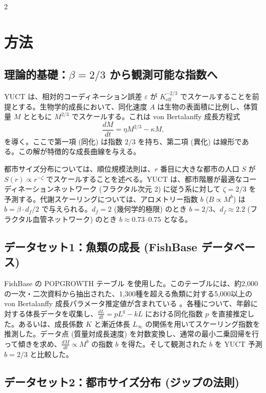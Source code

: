 \documentclass[11pt,a4paper]{article}
\newcommand{\eps}{\varepsilon}
\newcommand{\Keff}{K_{\mathrm{eff}}}
\newcommand{\betaf}{\beta}
\newcommand{\df}{d_f}
\begin{document}
\begin{multicols}{2}
		\section{方法}
		
		\subsection{理論的基礎：\(\beta = 2/3\) から観測可能な指数へ}
		
		YUCT は、相対的コーディネーション誤差 \(\eps\) が \(\Keff^{-2/3}\) でスケールすることを前提とする。生物学的成長において、同化速度 \(A\) は生物の表面積に比例し、体質量 \(M\) とともに \(M^{2/3}\) でスケールする。これは von Bertalanffy 成長方程式
		\[
		\frac{dM}{dt} = \eta M^{2/3} - \kappa M,
		\]
		を導く。ここで第一項 (同化) は指数 \(2/3\) を持ち、第二項 (異化) は線形である。この解が特徴的な成長曲線を与える。
		
		都市サイズ分布については、順位規模法則は、\(r\) 番目に大きな都市の人口 \(S\) が \(S(r) \propto r^{-\zeta}\) でスケールすることを述べる。YUCT は、都市階層が最適なコーディネーションネットワーク (フラクタル次元 2) に従う系に対して \(\zeta = 2/3\) を予測する。代謝スケーリングについては、アロメトリー指数 \(b\) (\(B \propto M^{b}\)) は \(b = \betaf \cdot \df / 2\) で与えられる。\(\df = 2\) (幾何学的極限) のとき \(b = 2/3\)、\(\df \approx 2.2\) (フラクタル血管ネットワーク) のとき \(b \approx 0.73\)–\(0.75\) となる。
		
		\subsection{データセット1：魚類の成長 (FishBase データベース)}
		
		FishBase の POPGROWTH テーブル \cite{FishBase} を使用した。このテーブルには、約2,000の一次・二次資料から抽出された、1,300種を超える魚類に対する5,000以上の von Bertalanffy 成長パラメータ推定値が含まれている \cite{Pauly1998}。各種について、年齢に対する体長データを収集し、\(\frac{dL}{dt} = p L^{q} - k L\) における同化指数 \(p\) を直接推定した。あるいは、成長係数 \(K\) と漸近体長 \(L_\infty\) の関係を用いてスケーリング指数を推測した。データ点 (質量対成長速度) を対数変換し、通常の最小二乗回帰を行って傾きを求め、\(\frac{dM}{dt} \propto M^{b}\) の指数 \(b\) を得た。そして観測された \(b\) を YUCT 予測 \(b = 2/3\) と比較した。
		
		\subsection{データセット2：都市サイズ分布 (ジップの法則)}
		

\end{multicols}
\end{document}
